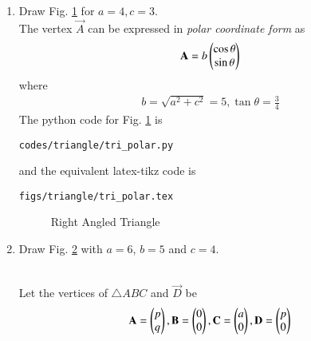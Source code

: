 \begin{enumerate}[label=\arabic*.,ref=\thesection.\theenumi]
\item Draw Fig. \ref{fig:tri_polar} for $a = 4, c =3$.
\label{const:tri_polar}
%
\\
\solution 
 The vertex  $\vec{A}$ can  be expressed  in {\em polar coordinate form} as
%
\begin{align}
\mathbf{A} = b\begin{pmatrix}\cos \theta\\  \sin \theta\end{pmatrix} 
\end{align}
%
where
\begin{align}
b = \sqrt{a^2+c^2} = 5, \tan \theta = \frac{3}{4}
\end{align}
%
The python code for  Fig. \ref{fig:tri_polar} is
\begin{lstlisting}
codes/triangle/tri_polar.py
\end{lstlisting}
%
and the equivalent latex-tikz code is
%
\begin{lstlisting}
figs/triangle/tri_polar.tex
\end{lstlisting}
\begin{figure}[!ht]
\centering
\resizebox{\columnwidth}{!}{}
\caption{Right Angled Triangle}
\label{fig:tri_polar}	
\end{figure}
%
\item Draw Fig. \ref{fig:tri_sss} with $a=6$, $b=5$  and $c=4$.  
\label{const:tri_sss}
\begin{figure}[!ht]
	\begin{center}
			\resizebox{\columnwidth}{!}{}
	\end{center}
	\caption{}
	\label{fig:tri_sss}	
\end{figure}
\\
\solution Let the vertices of  $\triangle ABC$ and $\vec{D}$ be 
\begin{align}
\label{eq:tri_basic}
\mathbf{A} = \begin{pmatrix}p\\q\end{pmatrix}, \mathbf{B} = \begin{pmatrix}0\\0\end{pmatrix}, \mathbf{C} = \begin{pmatrix}a\\0\end{pmatrix}, \mathbf{D} = \begin{pmatrix}p\\0\end{pmatrix}
\end{align}
%


\end{enumerate}
